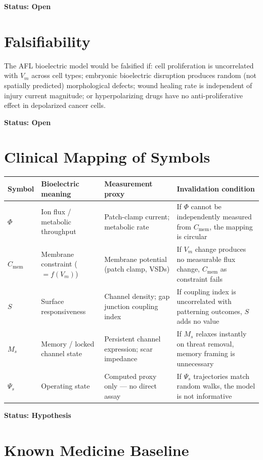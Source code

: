 \documentclass[12pt,a4paper]{article}
\begin{document}
\textbf{Status: Open}

\section{Falsifiability}

The AFL bioelectric model would be falsified if: cell proliferation is uncorrelated with $V_m$ across cell types; embryonic bioelectric disruption produces random (not spatially predicted) morphological defects; wound healing rate is independent of injury current magnitude; or hyperpolarizing drugs have no anti-proliferative effect in depolarized cancer cells.

\textbf{Status: Open}


\section{Clinical Mapping of Symbols}

\begin{center}
\begin{tabular}{p{1.8cm}p{3.2cm}p{3.5cm}p{4.5cm}}
\toprule
Symbol & Bioelectric meaning & Measurement proxy & Invalidation condition \\
\midrule
$\Phi$ & Ion flux / metabolic throughput & Patch-clamp current; metabolic rate & If $\Phi$ cannot be independently measured from $C_{\mathrm{mem}}$, the mapping is circular \\
$C_{\mathrm{mem}}$ & Membrane constraint ($=f(V_m)$) & Membrane potential (patch clamp, VSDs) & If $V_m$ change produces no measurable flux change, $C_{\mathrm{mem}}$ as constraint fails \\
$S$ & Surface responsiveness & Channel density; gap junction coupling index & If coupling index is uncorrelated with patterning outcomes, $S$ adds no value \\
$M_s$ & Memory / locked channel state & Persistent channel expression; scar impedance & If $M_s$ relaxes instantly on threat removal, memory framing is unnecessary \\
$\Psi_s$ & Operating state & Computed proxy only — no direct assay & If $\Psi_s$ trajectories match random walks, the model is not informative \\
\bottomrule
\end{tabular}
\end{center}

\textbf{Status: Hypothesis}

\section{Known Medicine Baseline}
\end{document}
